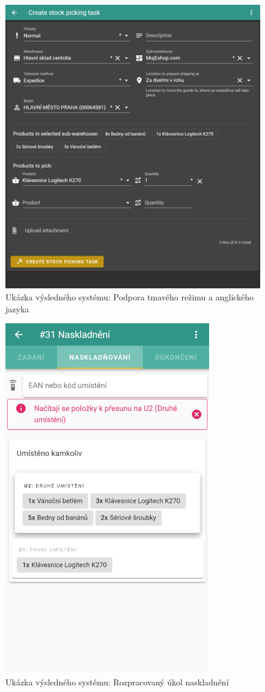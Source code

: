 \begin{figure}[]
\includegraphics[width=\textwidth]{../png/app/demo3.png}
\caption{Ukázka výsledného systému: Podpora tmavého režimu a anglického jazyka} \label{picture:demo3}
\end{figure}

\begin{figure}[]
\includegraphics[width=0.8\textwidth]{../png/app/demo4.png}
\caption{Ukázka výsledného systému: Rozpracovaný úkol naskladnění} \label{picture:demo4}
\end{figure}
